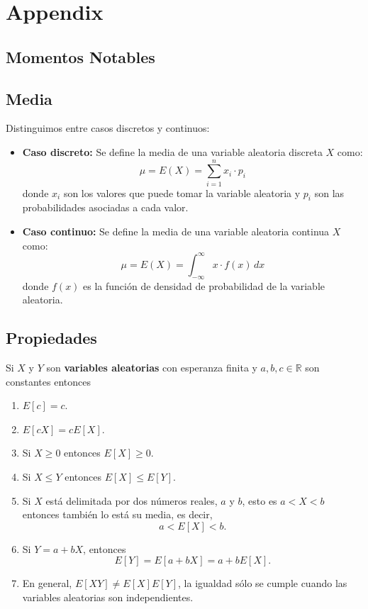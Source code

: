 \section{Appendix}

\subsection{Momentos Notables}

\subsection*{Media}
\begin{definición}[Media]
Distinguimos entre casos discretos y continuos:
\begin{itemize}
    \item \textbf{Caso discreto: } Se define la media de una variable aleatoria discreta $X$ como:
          \begin{equation}
              \mu = E(X) = \sum_{i=1}^{n} x_i \cdot p_i
          \end{equation}
          donde $x_i$ son los valores que puede tomar la variable aleatoria y $p_i$ son las probabilidades asociadas a cada valor.
    \item \textbf{Caso continuo: } Se define la media de una variable aleatoria continua $X$ como:
          \begin{equation}
              \mu = E(X) = \int_{-\infty}^{\infty} x \cdot f(x) \, dx
          \end{equation}
          donde $f(x)$ es la función de densidad de probabilidad de la variable aleatoria.
\end{itemize}
\end{definición}

\subsection*{Propiedades}

Si \( X \) y \( Y \) son \textbf{variables aleatorias} con esperanza finita y
\( a, b, c \in \mathbb{R} \) son constantes entonces

\begin{enumerate}
    \item \( E[c] = c \).
    \item \( E[cX] = c E[X] \).
    \item Si \( X \geq 0 \) entonces \( E[X] \geq 0 \).
    \item Si \( X \leq Y \) entonces \( E[X] \leq E[Y] \).
    \item Si \( X \) está delimitada por dos números reales, \( a \) y \( b \), esto es
          \( a < X < b \) entonces también lo está su media, es decir,
          \[
              a < E[X] < b.
          \]
    \item Si \( Y = a + bX \), entonces
          \[
              E[Y] = E[a + bX] = a + b E[X].
          \]
    \item En general, \( E[XY] \neq E[X] E[Y] \), la igualdad sólo se cumple cuando las
          variables aleatorias son independientes.
\end{enumerate}

